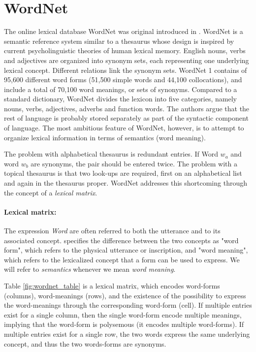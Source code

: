 \documentclass[a4paper,12pt,twoside,openright]{report}
\begin{document}
\section{WordNet}

The online lexical database WordNet was original introduced in \cite{miller90}.
WordNet is a semantic reference system similar to a thesaurus whose design is inspired by current psycholinguistic theories of human lexical memory.
English nouns, verbs and adjectives are organized into synonym sets, each representing one underlying lexical concept.
Different relations link the synonym sets.
WordNet 1 contains of 95,600 different word forms (51,500 simple words and 44,100 collocations), and include a total of 70,100 word meanings, or sets of synonyms.
Compared to a standard dictionary, WordNet divides the lexicon into five categories, namely nouns, verbs, adjectives, adverbs and function words. 
The authors argue that the rest of language is probably stored separately as part of the syntactic component of language.
The most ambitious feature of WordNet, however, is to attempt to organize lexical information in terms of semantics (word meaning).

The problem with alphabetical thesaurus is redundant entries. If Word $w_a$ and word $w_b$ are synonyms, the pair should be entered twice.
The problem with a topical thesaurus is that two look-ups are required, first on an alphabetical list and again in the thesaurus proper.
WordNet addresses this shortcoming through the concept of a \textit{lexical matrix}.

\paragraph{Lexical matrix:} 
The expression \textit{Word} are often referred to both the utterance and to its associated concept.
\cite{miller90} specifies the difference between the two concepts as "word form", which refers to the physical utterance or inscription, and "word meaning", which refers to the lexicalized concept that a form can be used to express.
We will refer to \textit{semantics} whenever we mean \textit{word meaning}.

Table \ref{fig:wordnet_table} is a lexical matrix, which encodes word-forms (columns), word-meanings (rows), and the existence of the possibility to express the word-meanings through the corresponding word-form (cell).
If multiple entries exist for a single column, then the single word-form encode multiple meanings, implying that the word-form is polysemous (it encodes multiple word-forms).
If multiple entries exist for a single row, the two words express the same underlying concept, and thus the two words-forms are synonyms.
\end{document}
